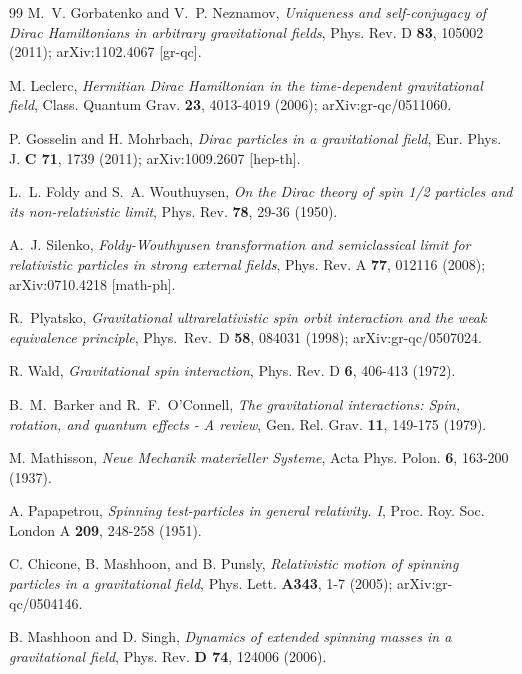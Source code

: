 \documentclass[preprint,showpacs,preprintnumbers,eqsecnum,amsmath,amssymb]{revtex4-1}
\begin{document}
\begin{thebibliography}{99}
M.~V. Gorbatenko and V.~P. Neznamov, {\it Uniqueness and self-conjugacy of Dirac
Hamiltonians in arbitrary gravitational fields}, 
Phys. Rev. D {\bf 83}, 105002 (2011); arXiv:1102.4067 [gr-qc].

M. Leclerc,
{\it Hermitian Dirac Hamiltonian in the time-dependent gravitational field},
Class. Quantum Grav. {\bf 23}, 4013-4019 (2006); arXiv:gr-qc/0511060.

P. Gosselin and H. Mohrbach, {\it Dirac particles in a gravitational field},
Eur. Phys. J. {\bf C 71}, 1739 (2011); arXiv:1009.2607 [hep-th].

L.~L. Foldy and S.~A. Wouthuysen,
{\it On the Dirac theory of spin 1/2 particles and its non-relativistic limit},
Phys. Rev. {\bf 78}, 29-36 (1950).

A.~J. Silenko, {\it Foldy-Wouthyusen transformation and semiclassical
limit for relativistic particles in strong external fields},
Phys. Rev. A \textbf{77}, 012116 (2008); arXiv:0710.4218 [math-ph].

R.~Plyatsko, {\it Gravitational ultrarelativistic spin orbit interaction 
and the weak equivalence principle},
Phys.\ Rev.\ D {\bf 58}, 084031 (1998); arXiv:gr-qc/0507024.

R. Wald, {\it Gravitational spin interaction},
Phys. Rev. D {\bf 6}, 406-413 (1972). %

B.~M.~Barker and R.~F.~O'Connell,
{\it The gravitational interactions: Spin, rotation, and quantum effects - A review},
Gen. Rel. Grav. {\bf 11}, 149-175 (1979). %

M. Mathisson, {\it Neue Mechanik materieller Systeme},
Acta Phys. Polon. {\bf 6}, 163-200 (1937).

A. Papapetrou, {\it Spinning test-particles in general relativity. I},
Proc. Roy. Soc. London A {\bf 209}, 248-258 (1951). %

C. Chicone, B. Mashhoon, and B. Punsly,
{\it Relativistic motion of spinning particles in a gravitational field},
Phys. Lett. {\bf A343}, 1-7 (2005); %
arXiv:gr-qc/0504146.

B. Mashhoon and D. Singh,
{\it Dynamics of extended spinning masses in a gravitational field},
Phys. Rev. {\bf D 74}, 124006 (2006). %


\end{thebibliography}
\end{document}
